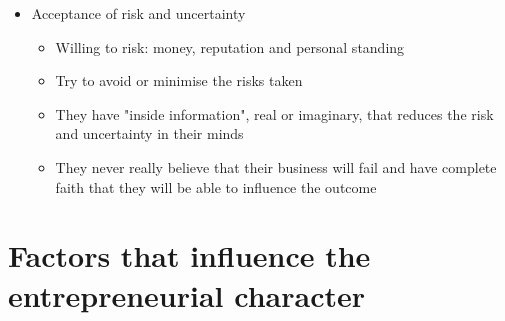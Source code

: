 \documentclass{article}[18pt]
\begin{document}
\begin{itemize}
\item Acceptance of risk and uncertainty
\begin{itemize}
\item Willing to risk: money, reputation and personal standing
\item Try to avoid or minimise the risks taken
\item They have "inside information", real or imaginary, that reduces the risk and uncertainty in their minds
\item They never really believe that their business will fail and have complete faith that they will be able to influence the outcome
\end{itemize}
\end{itemize}
\section{Factors that influence the entrepreneurial character}
\end{document}
